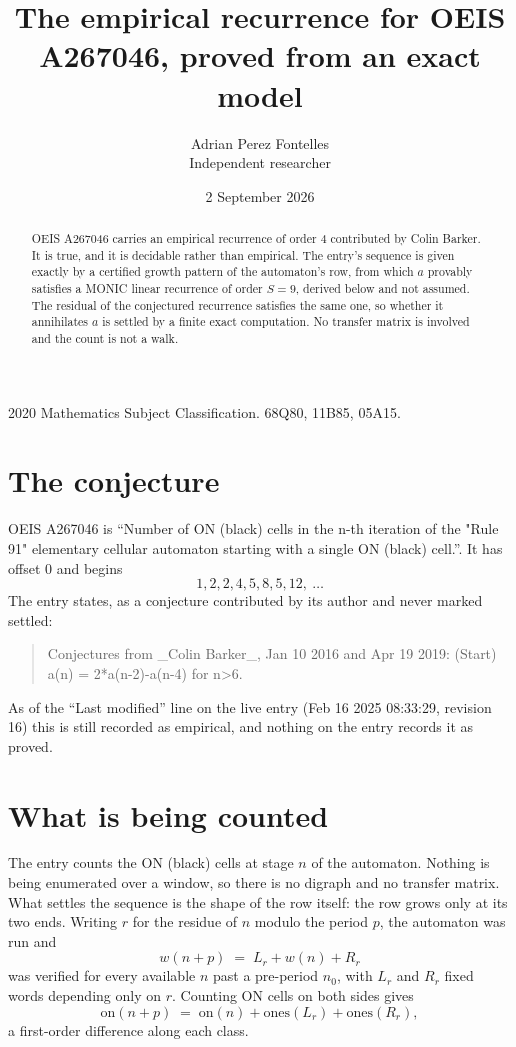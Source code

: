 \documentclass[11pt,a4paper]{article}
\title{The empirical recurrence for OEIS A267046, proved from an exact model}
\author{Adrian Perez Fontelles\\ \small Independent researcher}
\date{2 September 2026}
\theoremstyle{plain}
\theoremstyle{definition}
\begin{document}
\maketitle

\begin{abstract}
OEIS A267046 carries an empirical recurrence of order $4$ contributed by Colin Barker. It is true, and it is
decidable rather than empirical. The entry's sequence is given exactly by a certified growth pattern of the automaton's row, from
which $a$ provably satisfies a MONIC linear recurrence of order $S=9$, derived below and not
assumed. The residual of the conjectured recurrence satisfies the same one, so whether it
annihilates $a$ is settled by a finite exact computation. No transfer matrix is involved and
the count is not a walk.
\end{abstract}

\noindent\small 2020 Mathematics Subject Classification. 68Q80, 11B85, 05A15.\normalsize

\section{The conjecture}

OEIS A267046 is ``Number of ON (black) cells in the n-th iteration of the "Rule 91" elementary cellular automaton starting with a single ON (black) cell.''. It has offset $0$ and begins
\[
1, 2, 2, 4, 5, 8, 5, 12,\ \dots
\]
The entry states, as a conjecture contributed by its author and never marked settled:
\begin{quote}
Conjectures from \_Colin Barker\_, Jan 10 2016 and Apr 19 2019: (Start) a(n) = 2*a(n-2)-a(n-4) for n>6.
\end{quote}
As of the ``Last modified'' line on the live entry (Feb 16 2025 08:33:29, revision 16)
this is still recorded as empirical, and nothing on the entry records it as proved.

\section{What is being counted}

The entry counts the ON (black) cells at stage $n$ of the automaton. Nothing is being enumerated over a window, so there is
no digraph and no transfer matrix. What settles the sequence is the shape of the row itself:
the row grows only at its two ends. Writing
$r$ for the residue of $n$ modulo the period $p$, the automaton was run and
\[
w(n+p)\;=\;L_r + w(n) + R_r
\]
was verified for every available $n$ past a
pre-period $n_0$, with $L_r$ and $R_r$ fixed words depending only on $r$. Counting ON cells on
both sides gives
\[
\mathrm{on}(n+p)\;=\;\mathrm{on}(n)+\mathrm{ones}(L_r)+\mathrm{ones}(R_r),
\]
a first-order difference along each class.
\end{document}
